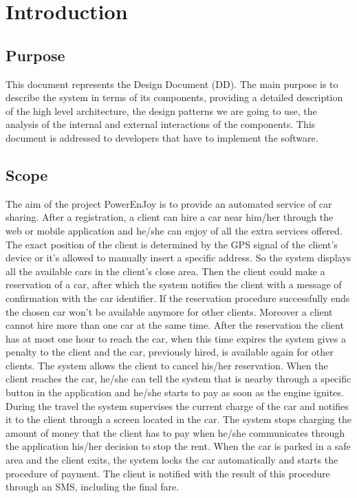 \chapter{Introduction}

\section{Purpose}
This document represents the Design Document (DD).
The main purpose is to describe the system in terms of its components, providing a detailed description of the high level architecture, the design patterns we are going to use, the analysis of the internal and external interactions of the components.
This document is addressed to developers that have to implement the software.

\section{Scope}
The aim of the project PowerEnJoy is to provide an automated service of car sharing.
After a registration, a client can hire a car near him/her through the web or mobile application and he/she can enjoy of all the extra services offered.
The exact position of the client is determined by the GPS signal of the client’s device or it’s allowed to manually insert a specific address.
So the system displays all the available cars in the client’s close area.
Then the client could make a reservation of a car, after which the system notifies the client with a message of confirmation with the car identifier.
If the reservation procedure successfully ends the chosen car won’t be available anymore for other clients.
Moreover a client cannot hire more than one car at the same time.
After the reservation the client has at most one hour to reach the car, when this time expires the system gives a penalty to the client and the car, previously hired, is available again for other clients.
The system allows the client to cancel his/her reservation.
When the client reaches the car, he/she can tell the system that is nearby through a specific button in the application and he/she starts to pay as soon as the engine ignites.
During the travel the system supervises the current charge of the car and notifies it to the client through a screen located in the car.
The system stops charging the amount of money that the client has to pay when he/she communicates through the application his/her decision to stop the rent.
When the car is parked in a safe area and the client exits, the system locks the car automatically and starts the procedure of payment.
The client is notified with the result of this procedure through an SMS, including the final fare.

